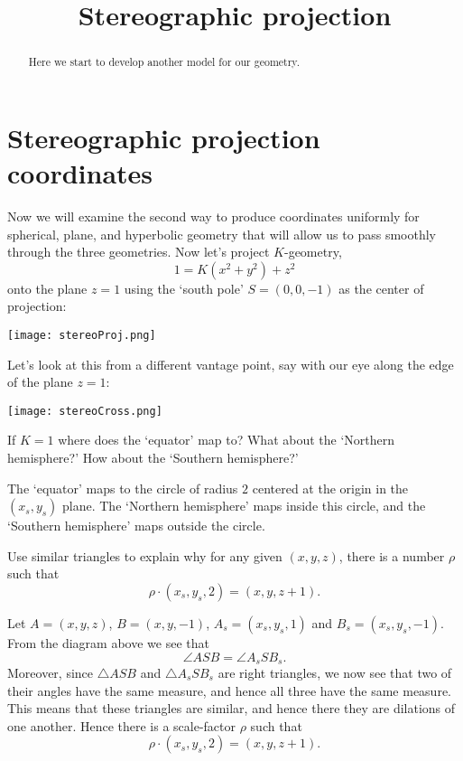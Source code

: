 \documentclass[newpage,hints,handout]{ximera}
\title{Stereographic projection}
\begin{document}
\begin{abstract}
Here we start to develop another model for our geometry.
\end{abstract}
\maketitle


\section{Stereographic projection coordinates}

Now we will examine the second way to produce coordinates uniformly for
spherical, plane, and hyperbolic geometry that will allow us to pass smoothly
through the three geometries. Now let's project $K$-geometry,
\[
1=K\left(x^{2}+y^{2}\right)+z^{2} 
\]
onto the plane $z=1$ using the `south pole' $S=(0,0,-1)$ as the center of
projection:
\begin{image}
\texttt{[image: stereoProj.png]}
\end{image}
Let's look at this from a different vantage point, say with our eye
along the edge of the plane $z=1$:
\begin{image}
\texttt{[image: stereoCross.png]}
\end{image}

\begin{problem}
  If $K=1$ where does the `equator' map to? What about the `Northern hemisphere?'
  How about the `Southern hemisphere?'
  \begin{freeResponse}
    The `equator' maps to the circle of radius $2$ centered at the
    origin in the $(x_s,y_s)$ plane.  The `Northern hemisphere' maps
    inside this circle, and the `Southern hemisphere' maps outside the
    circle.
  \end{freeResponse}
\end{problem}

\begin{problem}
  Use similar triangles to explain why for any given $(x,y,z)$, there
  is a number $\rho$ such that
  \[
  \rho\cdot(x_s,y_s,2) = (x,y,z+1).
  \]
  \begin{freeResponse}
    Let $A = (x,y,z)$, $B= (x,y,-1)$, $A_s = (x_s,y_s,1)$ and
    $B_s=(x_s,y_s,-1)$. From the diagram above we see that
    \[
    \angle ASB = \angle A_s S B_s.
    \]
    Moreover, since $\triangle ASB$ and $\triangle A_s S B_s$ are
    right triangles, we now see that two of their angles have the same
    measure, and hence all three have the same measure. This means
    that these triangles are similar, and hence there they are
    dilations of one another. Hence there is a scale-factor $\rho$
    such that
    \[
    \rho\cdot(x_s,y_s,2) = (x,y,z+1).
    \]
  \end{freeResponse}
\end{problem}
\end{document}
